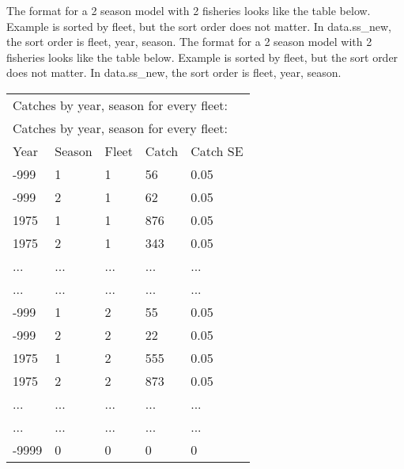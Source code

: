 The format for a 2 season model with 2 fisheries looks like the table below. Example is sorted by fleet, but the sort order does not matter. In data.ss\_new, the sort order is fleet, year, season.
The format for a 2 season model with 2 fisheries looks like the table below. Example is sorted by fleet, but the sort order does not matter. In data.ss\_new, the sort order is fleet, year, season.

\begin{center}
	\vspace*{-\baselineskip}
	\vspace*{-\baselineskip}
	\begin{tabular}{p{3cm} p{3cm} p{3cm} p{3cm} p{4cm}}
		\multicolumn{5}{l}{Catches by year, season for every fleet:} \\
		\multicolumn{5}{l}{Catches by year, season for every fleet:} \\
		\hline
		Year & Season & Fleet & Catch & Catch SE \Tstrut\Bstrut\\
		\hline
		-999 & 1 & 1 & 56  & 0.05 \Tstrut\\
		-999 & 2 & 1 & 62  & 0.05 \\
		1975 & 1 & 1 & 876 & 0.05 \\
		1975 & 2 & 1 & 343 & 0.05 \\
		 ... & ... & ... & ... & ... \\
		 ... & ... & ... & ... & ... \\
		-999 & 1 & 2 & 55  & 0.05 \\
		-999 & 2 & 2 & 22  & 0.05 \\
		1975 & 1 & 2 & 555 & 0.05 \\
		1975 & 2 & 2 & 873 & 0.05 \\
		 ... & ... & ... & ... & ... \\
		 ... & ... & ... & ... & ... \\
		-9999 & 0 & 0 & 0 & 0 \Bstrut\\
		\hline
	\end{tabular}
\end{center}

